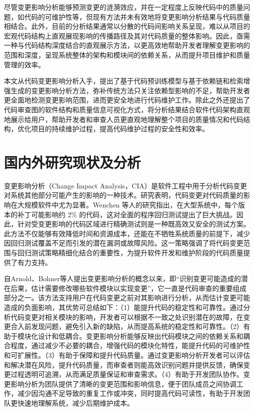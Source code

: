 尽管变更影响分析能够预测变更的涟漪效应，并在一定程度上反映代码中的质量问题，如代码的可维护性等\cite{KRETSOU2021110892,2025Change}，但现有方法并未有效地将变更影响分析结果与代码质量相结合。此外，目前的分析结果通常以分散的代码间影响关系呈现，难以从项目的宏观代码结构上直观展现影响的传播路径及其对代码质量的整体影响。因此，亟需一种与代码结构深度结合的直观展示方法，以更高效地帮助开发者理解变更影响的范围和深度，呈现系统整体的架构和模块间的依赖关系，从而提升项目维护和质量管理的效率。


本文从代码变更影响分析入手，提出了基于代码预训练模型与基于依赖链和检索增强生成的变更影响分析方法，弥补传统方法只关注依赖型影响的不足，帮助开发者更全面地检测变更影响范围，进而更安全地进行代码维护工作。除此之外还提出了代码审查图的软件结构和质量信息可视化方式，将分析结果结合软件代码架构直观地展示给用户，帮助开发者和审查人员更直观地理解整个项目的质量情况和代码结构，优化项目的持续维护过程，提高代码维护过程的安全性和效率。


\section{国内外研究现状及分析}

变更影响分析（Change Impact Analysis，CIA）是软件工程中用于分析代码变更对系统其他部分可能产生的影响的一种技术。研究表明，代码变更对代码质量的影响在大规模软件中尤为显著。Wenchen 等人的研究指出\cite{2013Large}，在大型系统中，每个版本的补丁可能影响约 2\% 的代码，这对全面的程序回归测试提出了巨大挑战。因此，针对受变更影响的代码区域进行精确测试则是一种既高效又安全的测试方案。此方法不仅能够有效降低时间和资源成本，还能在不牺牲系统质量的前提下，减少因回归测试覆盖不足而引发的潜在漏洞或故障风险。这一策略强调了将代码变更范围与回归测试策略精细化结合的重要性，为提升软件开发和维护阶段的代码质量提供了有力支持。

自Arnold、Bohner等人\cite{Arnold1996,1996Impact}提出变更影响分析的概念以来，即“识别变更可能造成的潜在后果，估计需要修改哪些软件模块以实现变更”，它一直是代码审查的重要组成部分之一。该方法支持用户在代码变更之前对其影响进行分析，从而估计变更可能造成的负面影响，其优势可总结如下：（1）能提升代码的稳定性和可靠性\cite{KRETSOU2021110892}。通过分析代码变更对相关模块的影响，开发者可以根据不一致之处识别潜在的故障，在变更合入前发现问题，避免引入新的缺陷，从而提高系统的稳定性和可靠性。（2）有助于模块化设计和低耦合。变更影响分析能够反映出代码模块之间的依赖关系和耦合程度，通过减少不必要的耦合，增强代码的模块化特性，能提升代码的可维护性和可扩展性。（3）有助于保障和提升代码质量。通过变更影响分析开发者可以评估和解决潜在风险，提升代码质量，而审查者则能高效识别问题并提供反馈，确保变更过程透明可追溯，从而满足质量保证和审查需求。（4）有助于开发团队协作。变更影响分析为团队提供了清晰的变更范围和影响信息，便于团队成员之间协调工作，减少因沟通不足导致的重复工作或冲突，同时提高代码可读性，有助于开发团队更快速地理解系统，减少后期维护成本。

